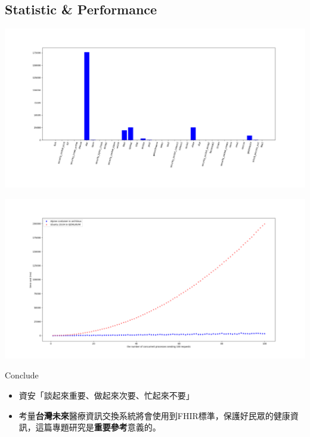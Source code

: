 \documentclass{beamer}
\begin{document}
\begin{CJK*}{UTF8}{bsmi}
    \section{Statistic \& Performance}
    \begin{frame}
        \centering
        \includegraphics[width=\textwidth, height=\textheight]{hist.png}
    \end{frame}
    \begin{frame}
        \centering
        \includegraphics[width=\textwidth, height=\textheight]{concurrent.png}
    \end{frame}

    \begin{frame}{Conclude}
        \centering
        \begin{itemize}
            \item 資安「談起來重要、做起來次要、忙起來不要」
            \item 考量{\color{mycolor}\textbf{台灣未來}}醫療資訊交換系統將會使用到FHIR標準，保護好民眾的健康資訊，這篇專題研究是{\color{mycolor}\textbf{重要參考}}意義的。
        \end{itemize}
    \end{frame}

\end{CJK*}
\end{document}
